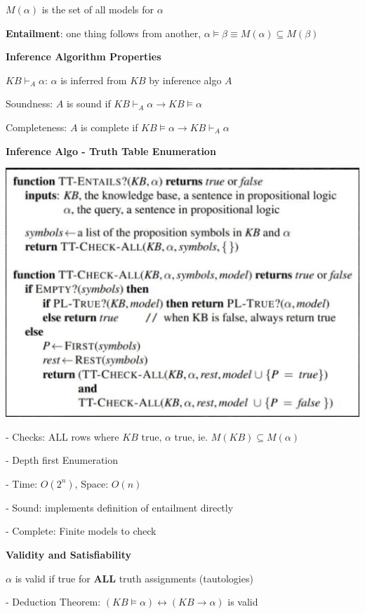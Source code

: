 \documentclass[10pt, a4paper]{article}
\newcommand{\highlight}[1]{{\color{red}\textbf{#1}}}
\newcommand{\green}[1]{{\color{PineGreen}#1}}
\newcommand{\tab}[0]{\hspace*{2mm}}
\begin{document}
\begin{multicols*}{3}
		$M(\alpha)$ is the set of all models for $\alpha$

		\textbf{Entailment}: one thing follows from another, $\alpha \models \beta \equiv M(\alpha) \subseteq M(\beta)$ 

		\textbf{Inference Algorithm Properties}

		$KB \vdash _A \alpha$: $\alpha$ is inferred from $KB$ by inference algo $A$

		Soundness: $A$ is \green{sound} if $KB \vdash _A \alpha \rightarrow KB \models \alpha$

		Completeness: $A$ is \green{complete} if $KB \models \alpha \rightarrow KB \vdash _A \alpha$

		\textbf{Inference Algo - Truth Table Enumeration}

		\includegraphics*[scale=0.15]{./assets/TruthTable.jpeg}

		- Checks: ALL rows where $KB$ true, $\alpha$ true, ie. $M(KB) \subseteq M(\alpha)$

		- Depth first Enumeration

		- Time: $O(2^n)$, Space: $O(n)$

		- \green{Sound}: implements definition of entailment directly

		- \green{Complete}: Finite models to check

		\textbf{Validity and Satisfiability}
		
		$\alpha$ is \green{valid} if true for \highlight{ALL} truth assignments (tautologies)

		\tab{} - Deduction Theorem: $(KB \models \alpha) \leftrightarrow (KB \rightarrow \alpha)$ is valid


\end{multicols*}
\end{document}
